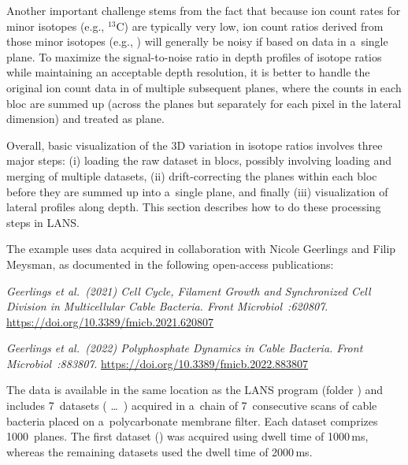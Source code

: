 Another important challenge stems from the fact that because ion count rates for minor isotopes (e.g., ${}^{13}\mathrm{C}$) are typically very low, ion count ratios derived from those minor isotopes (e.g., ) will generally be noisy if based on data in a~single plane. To maximize the signal-to-noise ratio in depth profiles of isotope ratios while maintaining an acceptable depth resolution, it is better to handle the original ion count data in  of multiple subsequent planes, where the counts in each bloc are summed up (across the planes but separately for each pixel in the lateral dimension) and treated as  plane.  

Overall, basic visualization of the 3D variation in isotope ratios involves three major steps: (i) loading the raw dataset in blocs, possibly involving loading and merging of multiple datasets, (ii) drift-correcting the planes within each bloc before they are summed up into a~single plane, and finally (iii) visualization of lateral profiles along depth. This section describes how to do these processing steps in LANS. 

The example uses data acquired in collaboration with Nicole Geerlings and Filip Meysman, as documented in the following open-access publications:
\skybluebox{}
\begin{center}
\begin{minipage}{0.98\textwidth}
\textsl{\small Geerlings et al.~(2021) Cell Cycle, Filament Growth and Synchronized Cell Division in Multicellular Cable Bacteria. \emph{Front Microbiol}~:620807}. \url{https://doi.org/10.3389/fmicb.2021.620807}
\end{minipage}
\end{center}
\tcbe
\skybluebox{}
\begin{center}
\begin{minipage}{0.98\textwidth}
\textsl{\small Geerlings et al.~(2022) Polyphosphate Dynamics in Cable Bacteria. \emph{Front Microbiol}~:883807}. \url{https://doi.org/10.3389/fmicb.2022.883807}
\end{minipage}
\end{center}
\tcbe

The data is available in the same location as the LANS program (folder ) and includes 7~datasets ( \dots\ ) acquired in a~chain of 7~consecutive scans of cable bacteria placed on a~polycarbonate membrane filter. Each dataset comprizes 1000~planes. The first dataset () was acquired using dwell time of 1000\,ms, whereas the remaining datasets used the dwell time of 2000\,ms.

